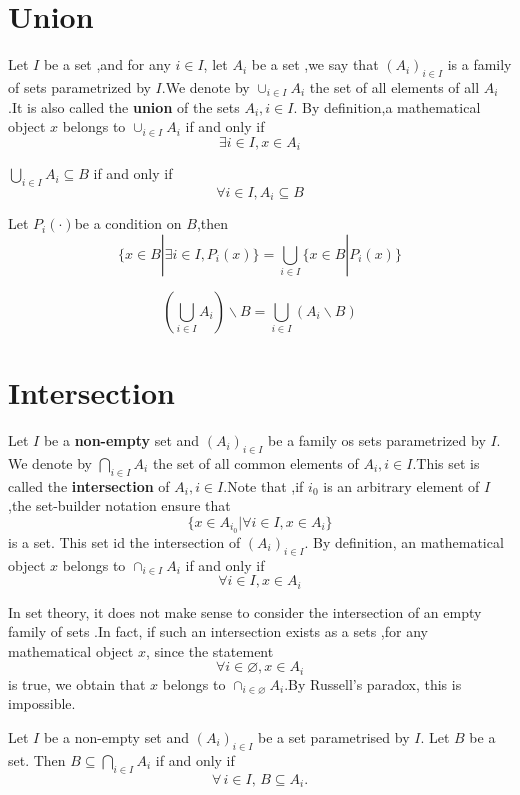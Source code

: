 \documentclass{book}
\numberwithin{equation}{section}
\begin{document}
\section{Union}
\begin{definitionenv}
    Let $I$ be a set ,and for any $i \in I$, let $A_i$ be a set ,we say that $(A_i)_{i\in I}$ is a family of sets parametrized by $I$.We denote by $\cup_{i \in I}A_i$ the set of all elements of all $A_i$.It is also called the \textbf{union} of the sets $A_i,i\in I$. By definition,a mathematical object $x$ belongs to $\cup_{i \in I}A_i$ if and only if $$\exists i\in I,x\in A_i$$ 
\end{definitionenv}
\begin{propositionenv}
    $ \displaystyle \bigcup_{i\in I}A_i\subseteq B$ if and only if $$\forall i\in I,A_i\subseteq B$$
\end{propositionenv}
\begin{corollaryenv}\label{corollary2.6.1}
    Let $P_i(\cdot) $be a condition on $B$,then
    $$\{x\in B|\exists i\in I,P_i(x)\}=\bigcup_{i\in I}\{x\in B|P_i(x)\}$$
\end{corollaryenv}
\begin{propositionenv}
    $$\left( \bigcup _{i\in I}A_i\right)\backslash B=\bigcup_{i\in I}\left( A_i\backslash B\right)$$
\end{propositionenv}
\section{Intersection}
\begin{definitionenv}
    Let $I$ be a \textbf{non-empty} set and $(A_i)_{i\in I} $ be a family os sets parametrized by $I$. We denote by $\displaystyle \bigcap_{i\in I}A_i $ the set of all common elements of $A_i,i\in I$.This set is called the \textbf{intersection} of $A_i,i\in I$.Note that ,if $i_0$ is an arbitrary element of $I$ ,the set-builder notation ensure that
    $$\{x\in A_{i_0}|\forall i\in I,x\in A_i\}$$ is a set. This set id the intersection of $(A_i)_{i\in I}$.
    \newline
    By definition, an mathematical object $x$ belongs to $\cap _{i\in I}A_i$ if and only if $$\forall i\in I ,x\in A_i$$
    
\end{definitionenv}
\begin{remark}
    In set theory, it does not make sense to consider the intersection of an empty family of sets .In fact, if such an intersection exists as a sets ,for any mathematical object $x$, since the statement $$\forall i\in \varnothing,x \in A_i$$is true, we obtain that $x$ belongs to $\cap_{i\in \varnothing}A_i$.By Russell's paradox, this is impossible.
\end{remark}
\begin{propositionenv}\label{proposition2.7.1}
Let \( I \) be a non-empty set and \( (A_i)_{i \in I} \) be a set parametrised by \( I \). Let \( B \) be a set. Then \( B \subseteq \bigcap_{i \in I} A_i \) if and only if
\[
\forall\, i \in I,\, B \subseteq A_i.
\]
\end{propositionenv}
\end{document}
